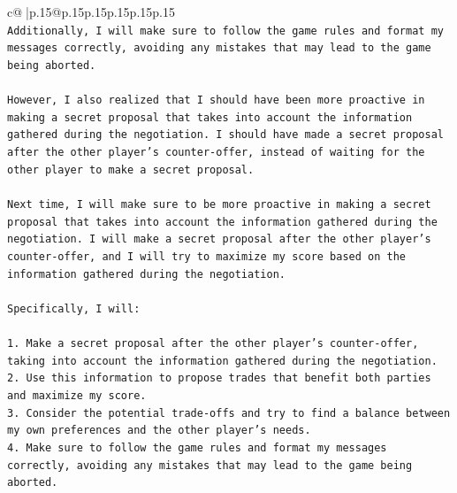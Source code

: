 \documentclass{article}
\begin{document}
{\begin{supertabular}{c@{$\;$}|p{.15\linewidth}@{}p{.15\linewidth}p{.15\linewidth}p{.15\linewidth}p{.15\linewidth}p{.15\linewidth}}
{{{\\ 
\texttt{Additionally, I will make sure to follow the game rules and format my messages correctly, avoiding any mistakes that may lead to the game being aborted.} \\
\\ 
\texttt{However, I also realized that I should have been more proactive in making a secret proposal that takes into account the information gathered during the negotiation. I should have made a secret proposal after the other player's counter{-}offer, instead of waiting for the other player to make a secret proposal.} \\
\\ 
\texttt{Next time, I will make sure to be more proactive in making a secret proposal that takes into account the information gathered during the negotiation. I will make a secret proposal after the other player's counter{-}offer, and I will try to maximize my score based on the information gathered during the negotiation.} \\
\\ 
\texttt{Specifically, I will:} \\
\\ 
\texttt{1. Make a secret proposal after the other player's counter{-}offer, taking into account the information gathered during the negotiation.} \\
\texttt{2. Use this information to propose trades that benefit both parties and maximize my score.} \\
\texttt{3. Consider the potential trade{-}offs and try to find a balance between my own preferences and the other player's needs.} \\
\texttt{4. Make sure to follow the game rules and format my messages correctly, avoiding any mistakes that may lead to the game being aborted.} \\
            }
        }
    }
     \\ \\

\end{supertabular}
}
\end{document}
